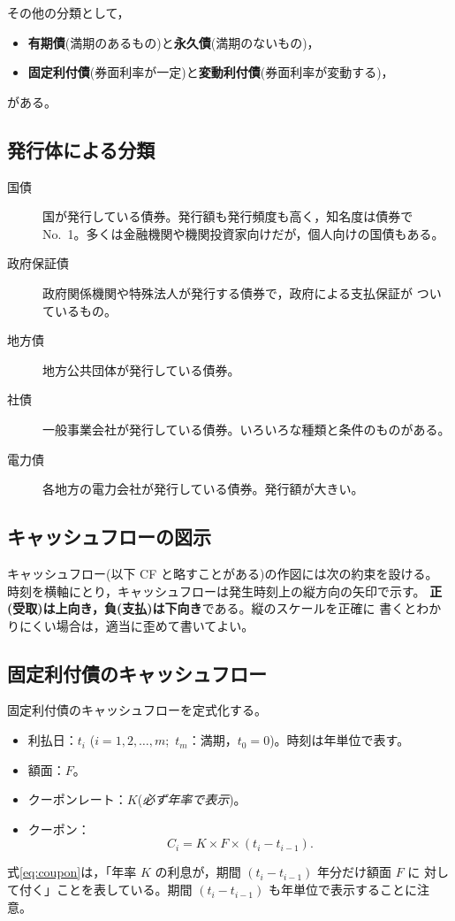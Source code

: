その他の分類として，
\begin{itemize}
\item \textbf{有期債}(満期のあるもの)と\textbf{永久債}(満期のないもの)，
\item \textbf{固定利付債}(券面利率が一定)と\textbf{変動利付債}(券面利率が変動する)，
\end{itemize}
がある。

\subsection{発行体による分類}

\begin{description}
\item[国債] 国が発行している債券。発行額も発行頻度も高く，知名度は債券で
No.~1。多くは金融機関や機関投資家向けだが，個人向けの国債もある。
\item[政府保証債] 政府関係機関や特殊法人が発行する債券で，政府による支払保証が
ついているもの。
\item[地方債] 地方公共団体が発行している債券。
\item[社債] 一般事業会社が発行している債券。いろいろな種類と条件のものがある。
\item[電力債] 各地方の電力会社が発行している債券。発行額が大きい。
\end{description}

\subsection{キャッシュフローの図示}

キャッシュフロー(以下 CF と略すことがある)の作図には次の約束を設ける。
時刻を横軸にとり，キャッシュフローは発生時刻上の縦方向の矢印で示す。
\textbf{正(受取)は上向き，負(支払)は下向き}である。縦のスケールを正確に
書くとわかりにくい場合は，適当に歪めて書いてよい。

\subsection{固定利付債のキャッシュフロー}

固定利付債のキャッシュフローを定式化する。
\begin{itemize}
\item 利払日：$t_i$ ($i=1,2,\dots,m$;\ $t_m$：満期，$t_0=0$)。時刻は年単位で表す。
\item 額面：$F$。
\item クーポンレート：$K$(\emph{必ず年率で表示})。
\item クーポン：
\begin{equation}
C_i = K \times F \times (t_i - t_{i-1}).
\label{eq:coupon}
\end{equation}
\end{itemize}
式\eqref{eq:coupon}は，「年率 $K$ の利息が，期間 $(t_i-t_{i-1})$ 年分だけ額面 $F$ に
対して付く」ことを表している。期間 $(t_i - t_{i-1})$ も年単位で表示することに注意。

